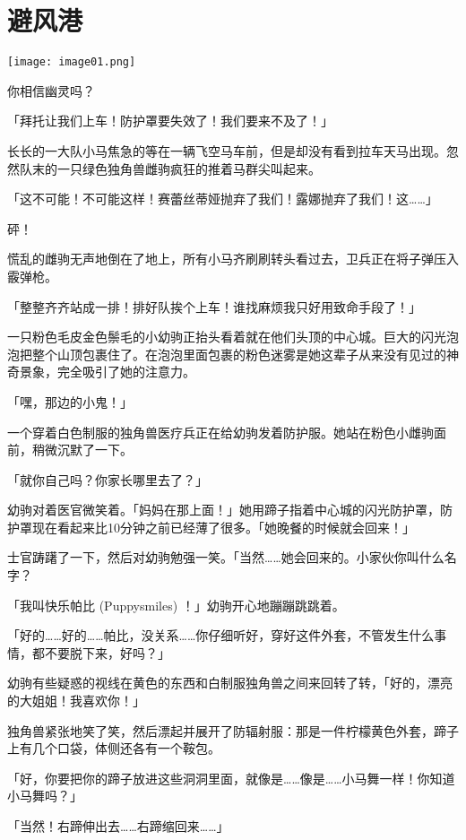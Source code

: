 \chapter{避风港}

\texttt{[image: image01.png]}

\begin{intro}
    你相信幽灵吗？
\end{intro}

「拜托让我们上车！防护罩要失效了！我们要来不及了！」

长长的一大队小马焦急的等在一辆飞空马车前，但是却没有看到拉车天马出现。忽然队末的一只绿色独角兽雌驹疯狂的推着马群尖叫起来。

「这不可能！不可能这样！赛蕾丝蒂娅抛弃了我们！露娜抛弃了我们！这……」

砰！

慌乱的雌驹无声地倒在了地上，所有小马齐刷刷转头看过去，卫兵正在将子弹压入霰弹枪。

「整整齐齐站成一排！排好队挨个上车！谁找麻烦我只好用致命手段了！」

一只粉色毛皮金色鬃毛的小幼驹正抬头看着就在他们头顶的中心城。巨大的闪光泡泡把整个山顶包裹住了。在泡泡里面包裹的粉色迷雾是她这辈子从来没有见过的神奇景象，完全吸引了她的注意力。

「嘿，那边的小鬼！」

一个穿着白色制服的独角兽医疗兵正在给幼驹发着防护服。她站在粉色小雌驹面前，稍微沉默了一下。

「就你自己吗？你家长哪里去了？」

幼驹对着医官微笑着。「妈妈在那上面！」她用蹄子指着中心城的闪光防护罩，防护罩现在看起来比10分钟之前已经薄了很多。「她晚餐的时候就会回来！」

士官踌躇了一下，然后对幼驹勉强一笑。「当然……她会回来的。小家伙你叫什么名字？

「我叫快乐帕比 (Puppysmiles) ！」幼驹开心地蹦蹦跳跳着。

「好的……好的……帕比，没关系……你仔细听好，穿好这件外套，不管发生什么事情，都不要脱下来，好吗？」

幼驹有些疑惑的视线在黄色的东西和白制服独角兽之间来回转了转，「好的，漂亮的大姐姐！我喜欢你！」

独角兽紧张地笑了笑，然后漂起并展开了防辐射服：那是一件柠檬黄色外套，蹄子上有几个口袋，体侧还各有一个鞍包。

「好，你要把你的蹄子放进这些洞洞里面，就像是……像是……小马舞一样！你知道小马舞吗？」

「当然！右蹄伸出去……右蹄缩回来……」


